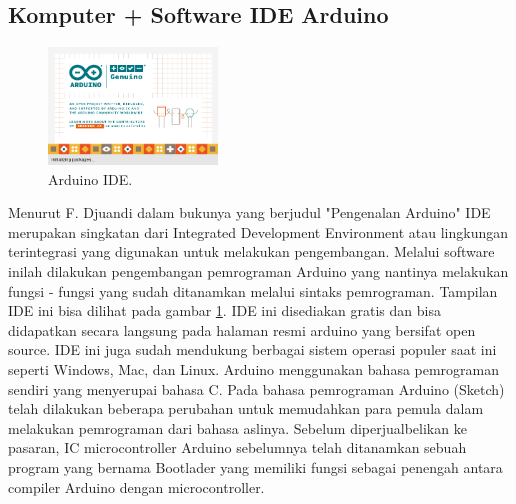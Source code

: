 \subsection{Komputer + Software IDE Arduino}
\begin{figure}[ht]
\centerline{\includegraphics[width=0.4\textwidth]{figures/aride11.png}}
\caption{Arduino IDE.}
\label{aide}
\end{figure}
Menurut F. Djuandi dalam bukunya yang berjudul "Pengenalan Arduino" \cite{djuandi2011pengenalan} IDE merupakan singkatan dari Integrated Development Environment atau lingkungan terintegrasi yang digunakan untuk melakukan pengembangan. Melalui software inilah dilakukan pengembangan pemrograman Arduino yang nantinya melakukan fungsi - fungsi yang sudah ditanamkan melalui sintaks pemrograman. Tampilan IDE ini bisa dilihat pada gambar \ref{aide}. IDE ini disediakan gratis dan bisa didapatkan secara langsung pada halaman resmi arduino yang bersifat open source. IDE ini juga sudah mendukung berbagai sistem operasi populer saat ini seperti Windows, Mac, dan Linux. Arduino menggunakan bahasa pemrograman sendiri yang menyerupai bahasa C. Pada bahasa pemrograman Arduino (Sketch) telah dilakukan beberapa perubahan untuk memudahkan para pemula dalam melakukan pemrograman dari bahasa aslinya. Sebelum diperjualbelikan ke pasaran, IC microcontroller Arduino sebelumnya telah ditanamkan sebuah program yang bernama Bootlader yang memiliki fungsi sebagai penengah antara compiler Arduino dengan microcontroller.

